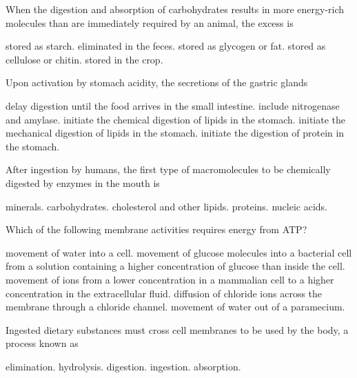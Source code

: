 \newpage

\question
When the digestion and absorption of carbohydrates results in more energy-rich molecules than are immediately required by an animal, the excess is

\begin{choices}
\choice stored as starch. 
\choice eliminated in the feces. 
\correctchoice stored as glycogen or fat. 
\choice stored as cellulose or chitin. 
\choice stored in the crop. 
\end{choices}

\question
Upon activation by stomach acidity, the secretions of the gastric glands

\begin{choices}
\choice delay digestion until the food arrives in the small intestine. 
\choice include nitrogenase and amylase. 
\choice initiate the chemical digestion of lipids in the stomach.  
\choice initiate the mechanical digestion of lipids in the stomach. 
\correctchoice initiate the digestion of protein in the stomach. 
\end{choices}

\question
After ingestion by humans, the first type of macromolecules to be chemically digested by enzymes in the mouth is

\begin{choices}
\choice minerals. 
\correctchoice carbohydrates. 
\choice cholesterol and other lipids. 
\choice proteins. 
\choice nucleic acids. 
\end{choices}

\question
Which of the following membrane activities requires energy from ATP?

\begin{choices}
\choice movement of water into a cell. 
\choice movement of glucose molecules into a bacterial cell from a solution containing a higher concentration of glucose than inside the cell. 
\correctchoice movement of  ions from a lower concentration in a mammalian cell to a higher concentration in the extracellular fluid. 
\choice diffusion of chloride ions across the membrane through a chloride channel. 
\choice movement of water out of a paramecium. 
\end{choices}

\question
Ingested dietary substances must cross cell membranes to be used by the body, a process known as

\begin{choices}
\choice elimination. 
\choice hydrolysis. 
\choice digestion. 
\choice ingestion. 
\correctchoice absorption. 
\end{choices}

